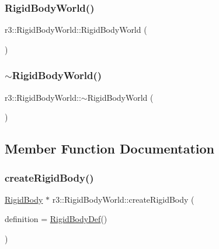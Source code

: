 \subsubsection{\texorpdfstring{Rigid\+Body\+World()}{RigidBodyWorld()}}
{\footnotesize\ttfamily r3\+::\+Rigid\+Body\+World\+::\+Rigid\+Body\+World (\begin{DoxyParamCaption}{ }\end{DoxyParamCaption})\hspace{0.3cm}{\ttfamily [default]}}

\mbox{\label{classr3_1_1_rigid_body_world_add6c229831a203d61ee8f5e2294b4192}} 
\subsubsection{\texorpdfstring{$\sim$\+Rigid\+Body\+World()}{~RigidBodyWorld()}}
{\footnotesize\ttfamily r3\+::\+Rigid\+Body\+World\+::$\sim$\+Rigid\+Body\+World (\begin{DoxyParamCaption}{ }\end{DoxyParamCaption})\hspace{0.3cm}{\ttfamily [default]}}



\subsection{Member Function Documentation}
\mbox{\label{classr3_1_1_rigid_body_world_a647ca787c02a56c230eb5d50080b561d}} 
\subsubsection{\texorpdfstring{create\+Rigid\+Body()}{createRigidBody()}}
{\footnotesize\ttfamily \mbox{\hyperlink{classr3_1_1_rigid_body}{Rigid\+Body}} $\ast$ r3\+::\+Rigid\+Body\+World\+::create\+Rigid\+Body (\begin{DoxyParamCaption}\item[{\mbox{\hyperlink{structr3_1_1_rigid_body_def}{Rigid\+Body\+Def}}}]{definition = {\ttfamily \mbox{\hyperlink{structr3_1_1_rigid_body_def}{Rigid\+Body\+Def}}()} }\end{DoxyParamCaption})}



